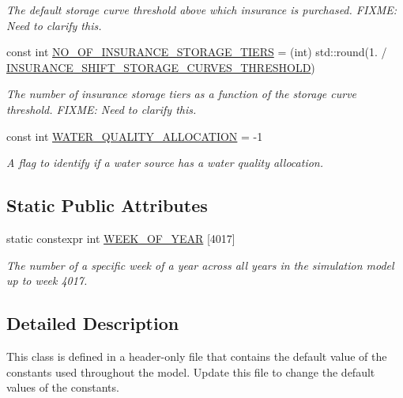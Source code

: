 \begin{DoxyCompactItemize}
\begin{DoxyCompactList}\small\item\em The default storage curve threshold above which insurance is purchased. F\+I\+X\+ME\+: Need to clarify this. \end{DoxyCompactList}\item 
const int \mbox{\hyperlink{classConstants_ae6ed2a07e84e5c0280325e2dffd3ceca}{N\+O\+\_\+\+O\+F\+\_\+\+I\+N\+S\+U\+R\+A\+N\+C\+E\+\_\+\+S\+T\+O\+R\+A\+G\+E\+\_\+\+T\+I\+E\+RS}} = (int) std\+::round(1. / \mbox{\hyperlink{classConstants_a40ab8dd088d886af9b5795c6b9db22ca}{I\+N\+S\+U\+R\+A\+N\+C\+E\+\_\+\+S\+H\+I\+F\+T\+\_\+\+S\+T\+O\+R\+A\+G\+E\+\_\+\+C\+U\+R\+V\+E\+S\+\_\+\+T\+H\+R\+E\+S\+H\+O\+LD}})
\begin{DoxyCompactList}\small\item\em The number of insurance storage tiers as a function of the storage curve threshold. F\+I\+X\+ME\+: Need to clarify this. \end{DoxyCompactList}\item 
const int \mbox{\hyperlink{classConstants_a35b1f837d5193288c3de6cb4d72f113c}{W\+A\+T\+E\+R\+\_\+\+Q\+U\+A\+L\+I\+T\+Y\+\_\+\+A\+L\+L\+O\+C\+A\+T\+I\+ON}} = -\/1
\begin{DoxyCompactList}\small\item\em A flag to identify if a water source has a water quality allocation. \end{DoxyCompactList}\end{DoxyCompactItemize}
\subsection*{Static Public Attributes}
\begin{DoxyCompactItemize}
\item 
static constexpr int \mbox{\hyperlink{classConstants_a2042beaed161d07b9d5cfaa2e8b958f3}{W\+E\+E\+K\+\_\+\+O\+F\+\_\+\+Y\+E\+AR}} \mbox{[}4017\mbox{]}
\begin{DoxyCompactList}\small\item\em The number of a specific week of a year across all years in the simulation model up to week 4017. \end{DoxyCompactList}\end{DoxyCompactItemize}


\subsection{Detailed Description}
This class is defined in a header-\/only file that contains the default value of the constants used throughout the model. Update this file to change the default values of the constants. 

